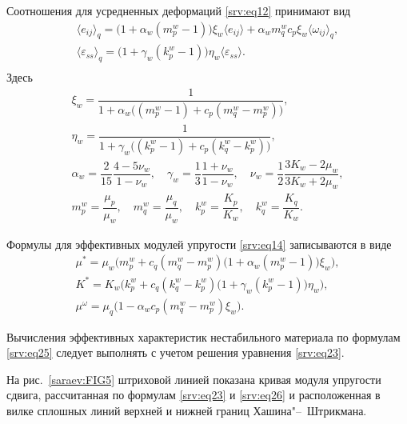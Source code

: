 Соотношения для усредненных деформаций \eqref{srv:eq12} принимают вид
\begin{equation}\label{srv:eq24}
\begin{array}{ll} 
\langle {e_{ij}}  \rangle_{q}=\bigl(1+\alpha_{w} (m_{p}^{w}-1)\bigr) \xi_{w} 
\langle {e_{ij}} \rangle+\alpha_{w} m_{q}^{w} c_{p} \xi_{w} \langle\omega_{ij} \rangle_{q},\\[2mm]
\langle {\varepsilon_{ss}} \rangle_{q}= \bigl(1+\gamma_{w} (k_{p}^{w}-1 )\bigr) \eta_{w}  \langle {\varepsilon_{ss}} \rangle.\\
\end{array}
\end{equation}
Здесь
\begin{equation}
\begin{array}{c}
\xi_{w}=\dfrac{1}{1+\alpha_{w}  \bigl( (m_{p}^{w}-1 )+c_{p}  (m_{q}^{w}-m_{p}^{w} )\bigr)},\\[2mm]
\eta_{w}=\dfrac{1}{1+\gamma_{w} \bigl( (k_{p}^{w}-1 )+c_{p}  (k_{q}^{w}-k_{p}^{w} )\bigr)},\\[2mm]
\alpha_{w}=\dfrac{2}{15} \dfrac{4-5\nu_{w}}{1-\nu_{w}},\quad \gamma_{w}=\dfrac{1}{3} \dfrac{1+\nu_{w}}{1-\nu_{w}},\quad \nu_{w}=\dfrac{1}{2} \dfrac{3K_{w}-2\mu_{w}}{3K_{w}+2\mu_{w}},\\[2mm]
m_{p}^{w}=\dfrac{\mu_{p}}{\mu_{w}},\quad m_{q}^{w}=\dfrac{\mu_{q}}{\mu_{w}},\quad k_{p}^{w}=\dfrac{K_{p}}{K_{w}},\quad k_{q}^{w}=\dfrac{K_{q}}{K_{w}}.
\end{array}
\end{equation}

Формулы для эффективных модулей упругости \eqref{srv:eq14} записываются в виде
\begin{equation}\label{srv:eq25}
\begin{array}{ll}
\mu^{*}=\mu_{w}\bigl(m_{p}^{w}+c_{q}  (m_{q}^{w}-m_{p}^{w} )  \bigl(1+\alpha_{w} (m_{p}^{w}-1) \bigr) \xi_{w}\bigr),\\
K^{*}=K_{w}\bigl(k_{p}^{w}+c_{q} (k_{q}^{w}-k_{p}^{w}) \bigl(1+\gamma_{w} (k_{p}^{w}-1 )\bigr) \eta_{w} \bigr),\\
\mu^{\omega}=\mu_{q} \bigl(1-\alpha_{w} c_{p} (m_{q}^{w}-m_{p}^{w}) \xi_{w} \bigr).
\end{array}
\end{equation}

Вычисления эффективных характеристик нестабильного материала по формулам \eqref{srv:eq25} следует выполнять с учетом решения уравнения \eqref{srv:eq23}.

На рис.~\ref{saraev:FIG5} штриховой линией показана кривая модуля упругости сдвига, рассчитанная по формулам \eqref{srv:eq23} и \eqref{srv:eq26} и расположенная в вилке сплошных линий верхней и нижней границ Хашина"--~Штрикмана.    

